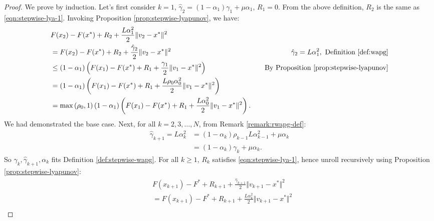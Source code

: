 \documentclass[12pt]{article}
\begin{document}
    \begin{proof}
        We prove by induction.
        Let's first consider $k = 1$, $\hat \gamma_2 = (1 - \alpha_1)\gamma_1 + \mu \alpha_1$, $R_1 = 0$.
        From the above definition, $R_2$ is the same as \eqref{eqn:stepwise-lya-1}.
        Invoking Proposition \ref{prop:stepwise-lyapunov}, we have:
        \begin{align*}
            & F(x_{2}) - F(x^*) + R_2 + \frac{L \alpha_1^2}{2}\Vert v_{2} - x^*\Vert^2
            \\
            & = F(x_{2}) - F(x^*) + R_2 + \frac{\hat \gamma_{2}}{2}\Vert v_{2} - x^*\Vert^2
            & \hat \gamma_2 = L \alpha_1^2 , \text{ Definition \ref{def:wapg}}
            \\
            &\le
            (1 - \alpha_1)\left(
                F(x_1) - F(x^*) + R_1 + \frac{\gamma_1}{2}\Vert v_1 - x^*\Vert^2
            \right)
            & \quad \text{By Proposition \ref{prop:stepwise-lyapunov}}
            \\
            &=
            (1 - \alpha_1)\left(
                F(x_1) - F(x^*) + R_1 + \frac{L\rho_{0}\alpha_{0}^2}{2}\Vert v_1 - x^*\Vert^2
            \right)
            \\
            &= \max\left(\rho_0, 1\right)
            (1 - \alpha_1)\left(
                F(x_1) - F(x^*) + R_1 + \frac{L\alpha_0^2}{2}\Vert v_1 - x^*\Vert^2
            \right).
        \end{align*}
        We had demonstrated the base case.
        Next, for all $k = 2, 3, \ldots, N$, from Remark \ref{remark:rwapg-def}:
        \begin{align*}
            \hat \gamma_{k + 1} = L\alpha_{k}^2
            &=(1 - \alpha_k)\rho_{k - 1}L\alpha_{k - 1}^2 + \mu\alpha_k
            \\
            &= (1 - \alpha_k)\gamma_k + \mu\alpha_k.
        \end{align*}
        So $\gamma_k, \hat \gamma_{k + 1}, \alpha_k$ fits Definition \ref{def:stepwise-wapg}.
        For all $k \ge 1$, $R_k$ satisfies \eqref{eqn:stepwise-lya-1}, hence unroll recursively using Proposition \ref{prop:stepwise-lyapunov}:
        {\small
        \begin{align*}
            &
            F(x_{k + 1}) - F^* + R_{k + 1} + \frac{\hat\gamma_{k + 1}}{2}\Vert v_{k + 1} - x^*\Vert^2
            \\
            &=
            F(x_{k + 1}) - F^* + R_{k + 1} + \frac{L \alpha_k^2}{2}\Vert v_{k + 1} - x^*\Vert^2
            \\

\end{align*}}
\end{proof}
\end{document}
